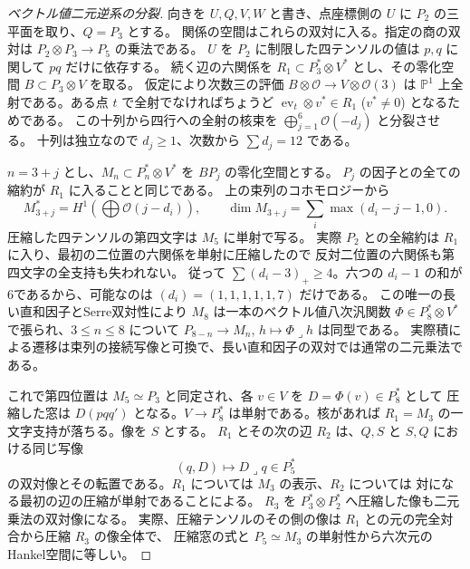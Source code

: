 \begin{proof}[ベクトル値二元逆系の分裂]
向きを $U,Q,V,W$ と書き、点座標側の $U$ に $P_2$ の三平面を取り、$Q=P_3$ とする。
関係の空間はこれらの双対に入る。指定の商の双対は $P_2\otimes P_3\to P_5$ の乗法である。
$U$ を $P_2$ に制限した四テンソルの値は $p,q$ に関して $pq$ だけに依存する。
続く辺の六関係を $R_1\subset P_3^*\otimes V^*$ とし、その零化空間 $B\subset P_3\otimes V$ を取る。
仮定により次数三の評価 $B\otimes\mathcal O\to V\otimes\mathcal O(3)$ は
$\mathbb P^1$ 上全射である。ある点 $t$ で全射でなければちょうど
$\operatorname{ev}_t\otimes v^*\in R_1$ ($v^*\ne0$) となるためである。
この十列から四行への全射の核束を $\bigoplus_{j=1}^6\mathcal O(-d_j)$ と分裂させる。
十列は独立なので $d_j\ge1$、次数から $\sum d_j=12$ である。

$n=3+j$ とし、$M_n\subset P_n^*\otimes V^*$ を $B P_j$ の零化空間とする。
$P_j$ の因子との全ての縮約が $R_1$ に入ることと同じである。
上の束列のコホモロジーから
\[
       M_{3+j}^*=H^1\!\left(\bigoplus\mathcal O(j-d_i)\right),
       \qquad \dim M_{3+j}=\sum_i\max(d_i-j-1,0).
\]
圧縮した四テンソルの第四文字は $M_5$ に単射で写る。
実際 $P_2$ との全縮約は $R_1$ に入り、最初の二位置の六関係を単射に圧縮したので
反対二位置の六関係も第四文字の全支持も失われない。
従って $\sum(d_i-3)_+\ge4$。六つの $d_i-1$ の和が6であるから、可能なのは
$(d_i)=(1,1,1,1,1,7)$ だけである。
この唯一の長い直和因子とSerre双対性により $M_8$ は一本のベクトル値八次汎関数
$\Phi\in P_8^*\otimes V^*$ で張られ、$3\le n\le8$ について
$P_{8-n}\to M_n$, $h\mapsto\Phi\mathbin{\lrcorner}h$ は同型である。
実際積による遷移は束列の接続写像と可換で、長い直和因子の双対では通常の二元乗法である。

これで第四位置は $M_5\simeq P_3$ と同定され、各 $v\in V$ を $D=\Phi(v)\in P_8^*$ として
圧縮した窓は $D(pqq')$ となる。$V\to P_8^*$ は単射である。核があれば
$R_1=M_3$ の一文字支持が落ちる。像を $S$ とする。
$R_1$ とその次の辺 $R_2$ は、$Q,S$ と $S,Q$ における同じ写像
\[
           (q,D)\longmapsto D\mathbin{\lrcorner}q\in P_5^*
\]
の双対像とその転置である。$R_1$ については $M_3$ の表示、$R_2$ については
対になる最初の辺の圧縮が単射であることによる。
$R_3$ を $P_3^*\otimes P_2^*$ へ圧縮した像も二元乗法の双対像になる。
実際、圧縮テンソルのその側の像は $R_1$ との元の完全対合から圧縮 $R_3$ の像全体で、
圧縮窓の式と $P_5\simeq M_3$ の単射性から六次元のHankel空間に等しい。
\end{proof}
